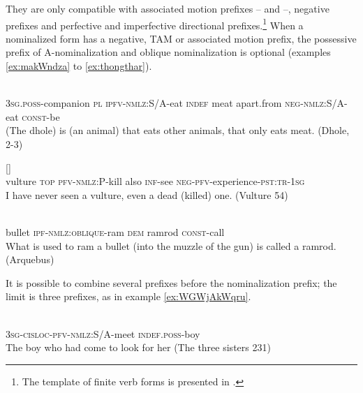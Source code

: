 They are only compatible with associated motion prefixes -- and --, negative prefixes and perfective and imperfective directional prefixes.\footnote{The template of finite verb forms is presented in \citet{jacques13harmonization}.} When a nominalized form has a negative, TAM or associated motion prefix, the possessive prefix of A-nominalization and oblique nominalization is optional (examples \ref{ex:makWndza} to \ref{ex:thongthar}).

    \begin{exe}
\ex \label{ex:makWndza}
  	  	  	  	  	  	 \\
\textsc{3sg.poss}-companion  \textsc{pl} \textsc{ipfv-nmlz}:S/A-eat \textsc{indef} meat apart.from \textsc{neg-nmlz}:S/A-eat \textsc{const}-be \\
\glt (The dhole) is (an animal) that eats other animals, that only eats meat. (Dhole, 2-3)
 \end{exe}
     \begin{exe}
\ex \label{ex:kill4}
\gll
{}  	  	[]  	  	  	  \\
vulture \textsc{top} \textsc{pfv-nmlz:P}-kill  also \textsc{inf}-see \textsc{neg-pfv}-experience-\textsc{pst:tr-1sg} \\
\glt I have never seen a vulture, even a dead (killed) one. (Vulture 54)
 \end{exe}
  
  
 \begin{exe}
\ex \label{ex:thongthar}
   	   	   	  	    \\
bullet \textsc{ipf}-\textsc{nmlz:oblique}-ram   \textsc{dem} ramrod \textsc{const}-call \\
 \glt What is used to ram a bullet (into the muzzle of the gun) is called a ramrod. (Arquebus)
 \end{exe}

It is possible to combine several prefixes before the nominalization prefix; the limit is three prefixes, as in example \ref{ex:WGWjAkWqru}.
 \begin{exe}
\ex \label{ex:WGWjAkWqru}
\gll
  	  	  	   \\
  \textsc{3sg-cisloc-pfv-nmlz:}S/A-meet \textsc{indef.poss}-boy   \\
\glt The boy  who had come to look for her (The three sisters 231)
 \end{exe}
 
